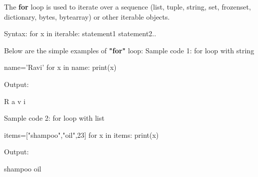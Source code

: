 \setlength{\columnsep}{3pt}
\begin{flushleft}
	
	The \textbf{for} loop is used to iterate over a sequence (list, tuple, string, set, frozenset, dictionary, bytes, bytearray) or
	other iterable objects.
	
	\begin{tcolorbox}[breakable,notitle,boxrule=1pt,colback=pink,colframe=pink]
		\color{black}
		\font=8pt
		Syntax: 
		\newline
		for x in iterable:
		\newline
		\hphantom{} \hphantom{}  statement1 \newline
		\hphantom{} \hphantom{}  statement2..
		\font=4pt
	\end{tcolorbox}
	\bigskip
	Below are the simple examples of \textbf{"for"} loop: \newline
	Sample code 1:
for loop with string
	\begin{tcolorbox}[breakable,notitle,boxrule=-0pt,colback=code,colframe=code]
		\color{white}
		\font=8pt
		name='Ravi' \newline
		for x in name: \newline
		\hphantom{} \hphantom{}	print(x)
		\font=4pt
	\end{tcolorbox}
	
	Output:
	\begin{tcolorbox}[breakable,notitle,boxrule=-0pt,colback=output,colframe=output]
		\color{black}
		R \newline
		a \newline
		v \newline
		i
		\font=4pt
	\end{tcolorbox}

	\bigskip	
	Sample code 2: for loop with list
	\begin{tcolorbox}[breakable,notitle,boxrule=-0pt,colback=code,colframe=code]
		\color{white}
		\font=8pt
		items=["shampoo","oil",23] \newline
		for x in items: \newline
		\hphantom{} \hphantom{}	print(x)
		\font=4pt
	\end{tcolorbox}
	
	Output:
	\begin{tcolorbox}[breakable,notitle,boxrule=-0pt,colback=output,colframe=output]
		\color{black}
		shampoo \newline
		oil 
		\font=4pt
	\end{tcolorbox}
	

\end{flushleft}
